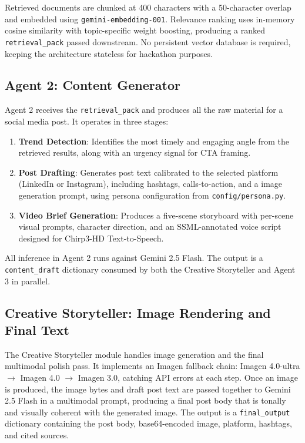 \documentclass[12pt, letterpaper]{article}
\begin{document}
Retrieved documents are chunked at 400 characters with a 50-character overlap and
embedded using \texttt{gemini-embedding-001}. Relevance ranking uses in-memory cosine
similarity with topic-specific weight boosting, producing a ranked \texttt{retrieval\_pack}
passed downstream. No persistent vector database is required, keeping the architecture
stateless for hackathon purposes.

\subsection{Agent 2: Content Generator}

Agent 2 receives the \texttt{retrieval\_pack} and produces all the raw material for
a social media post. It operates in three stages:

\begin{enumerate}[leftmargin=1.5em]
  \item \textbf{Trend Detection}: Identifies the most timely and engaging angle
    from the retrieved results, along with an urgency signal for CTA framing.
  \item \textbf{Post Drafting}: Generates post text calibrated to the selected
    platform (LinkedIn or Instagram), including hashtags, calls-to-action, and a
    image generation prompt, using persona configuration from
    \texttt{config/persona.py}.
  \item \textbf{Video Brief Generation}: Produces a five-scene storyboard with per-scene
    visual prompts, character direction, and an SSML-annotated voice script designed
    for Chirp3-HD Text-to-Speech.
\end{enumerate}

All inference in Agent 2 runs against Gemini 2.5 Flash. The output is a
\texttt{content\_draft} dictionary consumed by both the Creative Storyteller and
Agent 3 in parallel.

\subsection{Creative Storyteller: Image Rendering and Final Text}

The Creative Storyteller module handles image generation and the final multimodal
polish pass. It implements an Imagen fallback chain: Imagen 4.0-ultra $\to$ Imagen
4.0 $\to$ Imagen 3.0, catching API errors at each step. Once an image is produced,
the image bytes and draft post text are passed together to Gemini 2.5 Flash in a
multimodal prompt, producing a final post body that is tonally and visually coherent
with the generated image. The output is a \texttt{final\_output} dictionary containing
the post body, base64-encoded image, platform, hashtags, and cited sources.
\end{document}
